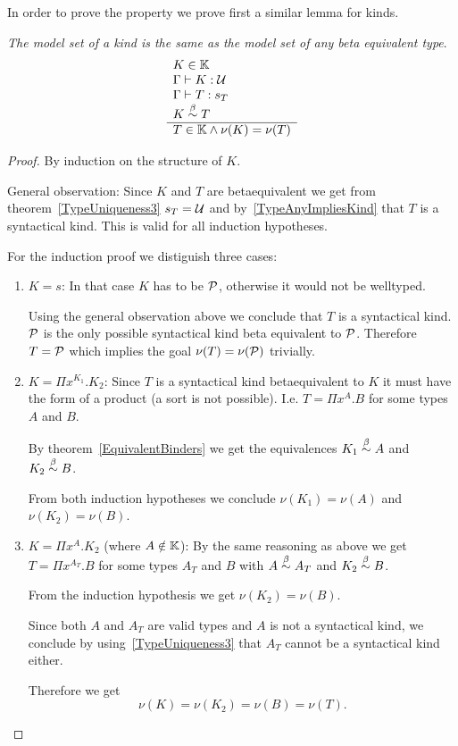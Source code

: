 In order to prove the property we prove first a similar lemma for kinds.

\begin{lemma}
    \label{ModelEquivalentKinds}
    \emph{The model set of a kind is the same as the model set of any beta
    equivalent type}.
    $$
    \begin{array}{l} 
        K \in \mathbb{K}
        \\
        \Gamma \vdash K: {\cal U}
        \\
        \Gamma \vdash T: s_T
        \\
        K \stackrel{\beta}{\sim} T
     \\ \hline 
        T \in \mathbb{K} \land \nu(K) = \nu(T)
    \end{array}
    $$

    \begin{proof}
        By induction on the structure of $K$.

        General observation: Since $K$ and $T$ are betaequivalent we get from
        theorem~\ref{TypeUniqueness3} $s_T = {\cal U}$ and
        by~\ref{TypeAnyImpliesKind} that $T$ is a syntactical kind. This is
        valid for all induction hypotheses.

        For the induction proof we distiguish three cases:
        \begin{enumerate}
        \item $K = s$: In that case $K$ has to be ${\cal P}$, otherwise it would
            not be welltyped.

            Using the general observation above we conclude that
            $T$ is a syntactical kind. ${\cal P}$ is the only possible syntactical
                kind beta equivalent to ${\cal P}$. Therefore $T = {\cal P}$ which
                implies the goal $\nu(T) = \nu({\cal P})$ trivially.

        \item $K = \Pi x^{K_1}. K_2$:
            Since $T$ is a syntactical kind betaequivalent to $K$ it must have
                the form of a product (a sort is not possible). I.e. $T = \Pi
                x^A.B$ for some types $A$ and $B$.

            By theorem~\ref{EquivalentBinders} we get the equivalences $K_1
                \stackrel{\beta}{\sim} A$ and $K_2 \stackrel{\beta}{\sim} B$.

            From both induction hypotheses we conclude $\nu(K_1) = \nu(A)$ and
            $\nu(K_2) = \nu(B)$.


        \item $K = \Pi x^A . K_2$ (where $A \notin \mathbb{K}$):
            By the same reasoning as above we get $T = \Pi x^{A_T}.B$ for some
            types $A_T$ and $B$ with $A \stackrel{\beta}{\sim} A_T$ and $ K_2 \stackrel{\beta}{\sim} B$.

                From the induction hypothesis we get $\nu(K_2) = \nu(B)$.

            Since both $A$ and $A_T$ are valid types and $A$ is not a
                syntactical kind, we conclude by using~\ref{TypeUniqueness3}
                that $A_T$ cannot be a syntactical kind either.

            Therefore we get
            $$
                \nu(K) = \nu(K_2) = \nu(B) = \nu(T).
            $$
        \end{enumerate}
    \end{proof}
\end{lemma}


